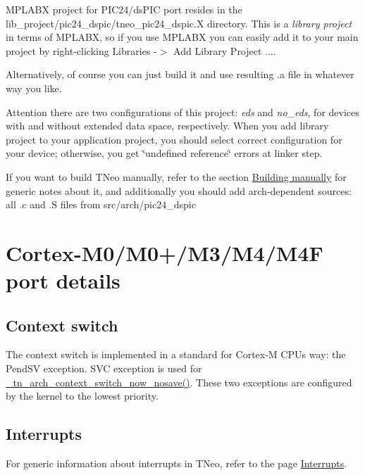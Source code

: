 M\+P\+L\+A\+BX project for P\+I\+C24/ds\+P\+IC port resides in the {\ttfamily lib\+\_\+project/pic24\+\_\+dspic/tneo\+\_\+pic24\+\_\+dspic.\+X} directory. This is a {\itshape library project} in terms of M\+P\+L\+A\+BX, so if you use M\+P\+L\+A\+BX you can easily add it to your main project by right-\/clicking {\ttfamily Libraries -\/$>$ Add Library Project ...}.

Alternatively, of course you can just build it and use resulting {\ttfamily .a} file in whatever way you like.

\begin{DoxyAttention}{Attention}
there are two configurations of this project\+: {\itshape eds} and {\itshape  no\+\_\+eds}, for devices with and without extended data space, respectively. When you add library project to your application project, you should select correct configuration for your device; otherwise, you get \char`\"{}undefined reference\char`\"{} errors at linker step.
\end{DoxyAttention}
If you want to build T\+Neo manually, refer to the section \hyperlink{building_building_generic__manual}{Building manually} for generic notes about it, and additionally you should add arch-\/dependent sources\+: all {\ttfamily .c} and {\ttfamily .S} files from {\ttfamily src/arch/pic24\+\_\+dspic}\hypertarget{arch_specific_cortex_m_details}{}\section{Cortex-\/\+M0/\+M0+/\+M3/\+M4/\+M4\+F port details}\label{arch_specific_cortex_m_details}
\hypertarget{arch_specific_cortex_m_context_switch}{}\subsection{Context switch}\label{arch_specific_cortex_m_context_switch}
The context switch is implemented in a standard for Cortex-\/M C\+P\+Us way\+: the Pend\+SV exception. S\+VC exception is used for {\ttfamily \hyperlink{tn__arch_8h_afd5f43f42f5645de164ba6d13d3a4bcf}{\+\_\+tn\+\_\+arch\+\_\+context\+\_\+switch\+\_\+now\+\_\+nosave()}}. These two exceptions are configured by the kernel to the lowest priority.\hypertarget{arch_specific_cortex_m_interrupts}{}\subsection{Interrupts}\label{arch_specific_cortex_m_interrupts}
For generic information about interrupts in T\+Neo, refer to the page \hyperlink{interrupts}{Interrupts}.

